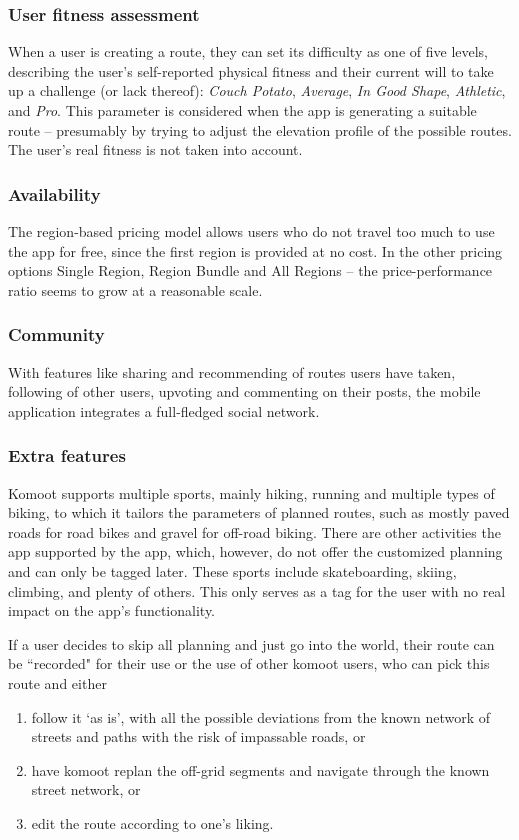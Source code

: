 \subsubsection*{User fitness assessment}
When a user is creating a route, they can set its difficulty as one of five levels, 
describing the user's self-reported physical fitness and their current will to take up a challenge (or lack thereof): \textit{Couch Potato}, \textit{Average}, \textit{In Good Shape}, \textit{Athletic}, and \textit{Pro}.
This parameter is considered when the app is generating a suitable route -- presumably by trying to adjust the elevation profile of the possible routes.
The user's real fitness is not taken into account.

\subsubsection*{Availability}
The region-based pricing model allows users who do not travel too much to use the app for free,
since the first region is provided at no cost.
In the other pricing options Single Region, Region Bundle and All Regions -- the price-performance ratio seems to grow at a reasonable scale.
\subsubsection*{Community}
With features like sharing and recommending of routes users have taken, following of other users, upvoting and commenting on their posts, the mobile application integrates a full-fledged social network.
\subsubsection*{Extra features}
Komoot supports multiple sports, mainly hiking, running and multiple types of biking, to which it tailors the parameters of planned routes, such as mostly paved roads for road bikes and gravel for off-road biking.
There are other activities the app supported by the app, which, however, do not offer the customized planning and can only be tagged later.
These sports include skateboarding, skiing, climbing, and plenty of others.
This only serves as a tag for the user with no real impact on the app's functionality.

If a user decides to skip all planning and just go into the world, their route can be ``recorded" for their use or the use of other komoot users, who can pick this route and either

\begin{enumerate}[label=\alph*)]
    \item follow it `as is', with all the possible deviations from the known network of streets and paths with the risk of impassable roads, or
    \item have komoot replan the off-grid segments and navigate through the known street network, or
    \item edit the route according to one's liking.
\end{enumerate}

